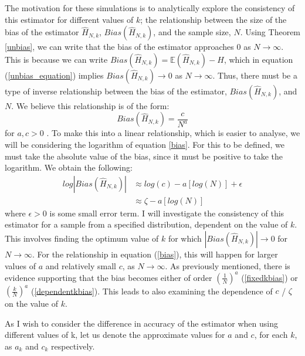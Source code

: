 \documentclass[12pt]{report}
\begin{document}
The motivation for these simulations is to analytically explore the consistency of this estimator for different values of $k$; the relationship between the size of the bias of the estimator $\hat{H}_{N, k}$, $Bias(\hat{H}_{N, k})$,  and the sample size, $N$. Using Theorem \ref{unbias}, we can write that the bias of the estimator approaches 0 as $N \to \infty$. This is because we can write $Bias(\hat{H}_{N, k} ) = \mathbb{E}(\hat{H}_{N, k}) - H$, which in equation (\ref{unbias_equation}) implies $Bias(\hat{H}_{N, k}) \to 0$ as $N \to \infty$. Thus, there must be a type of inverse relationship between the bias of the estimator, $Bias(\hat{H}_{N, k})$, and $N$. We believe this relationship is of the form:
\begin{equation} \label{bias}
Bias(\hat{H}_{N, k}) = \frac{c}{N^a}
\end{equation}
for $a, c > 0$ \cite{paper3, paper4}. To make this into a linear relationship, which is easier to analyse, we will be considering the logarithm of equation \ref{bias}. For this to be defined, we must take the absolute value of the bias, since it must be positive to take the logarithm. We obtain the following:
\begin{align} 
log|Bias(\hat{H}_{N, k})| &\approx log(c) - a [log(N)] + \epsilon \nonumber \\
&\approx \zeta - a [log(N)] \label{logbias}
\end{align}
where $\epsilon > 0$ is some small error term. I will investigate the consistency of this estimator for a sample from a specified distribution, dependent on the value of $k$. This involves finding the optimum value of $k$ for which $|Bias(\hat{H}_{N, k})| \to 0$ for $N \to \infty$. For the relationship in equation (\ref{bias}), this will happen for larger values of $a$ and relatively small $c$, as $N \to \infty$. As previously mentioned, there is evidence supporting that the bias becomes either of order $(\frac{1}{N})^a$ (\ref{fixedkbias}) or $(\frac{k}{N})^a$ (\ref{dependentkbias}). This leads to also examining the dependence of $c$ / $\zeta$ on the value of $k$. 

As I wish to consider the difference in accuracy of the estimator when using different values of k, let us denote the approximate values for $a$ and $c$, for each $k$, as $a_{k}$ and $c_{k}$ respectively.
\end{document}
